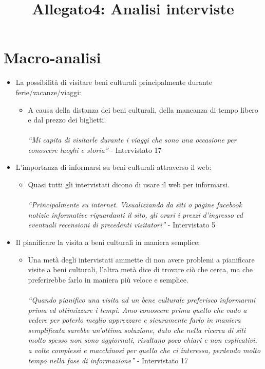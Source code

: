 \documentclass{article}
\title{\textbf{Allegato4: Analisi interviste}}
\date{}
\begin{document}
\maketitle

\noindent

\section{Macro-analisi}
\begin{itemize}
\item La possibilità di visitare beni culturali principalmente durante ferie/vacanze/viaggi:
\begin{itemize}
\item A causa della distanza dei beni culturali, della mancanza di tempo libero e dal prezzo dei biglietti.
\\\\
\textit{“Mi capita di visitarle durante i viaggi che sono una occasione per conoscere luoghi e storia”} - Intervistato 17
\end{itemize}
\item L’importanza di informarsi su beni culturali attraverso il web:
\begin{itemize}
\item Quasi tutti gli intervistati dicono di usare il web per informarsi.
\\\\
\textit{“Principalmente su internet. Visualizzando da siti o pagine facebook notizie informative riguardanti il sito, gli orari i prezzi d'ingresso ed eventuali recensioni di precedenti visitatori”} - Intervistato 5
\end{itemize}
\item Il pianificare la visita a beni culturali in maniera semplice:
\begin{itemize}
\item Una metà degli intervistati ammette di non avere problemi a pianificare visite a beni culturali, l’altra metà dice di trovare ciò che cerca, ma che preferirebbe farlo in maniera più veloce e semplice.
\\\\
\textit{“Quando pianifico una visita ad un bene culturale preferisco informarmi prima ed ottimizzare i tempi. Amo conoscere prima quello che vado a vedere per poterlo meglio apprezzare e sicuramente farlo in maniera semplificata sarebbe un’ottima soluzione, dato che nella ricerca di siti molto spesso non sono aggiornati, risultano poco chiari e non esplicativi, a volte complessi e macchinosi per quello che ci interessa, perdendo molto tempo nella fase di informazione”} - Intervistato 17

\end{itemize}
\end{itemize}
\end{document}
